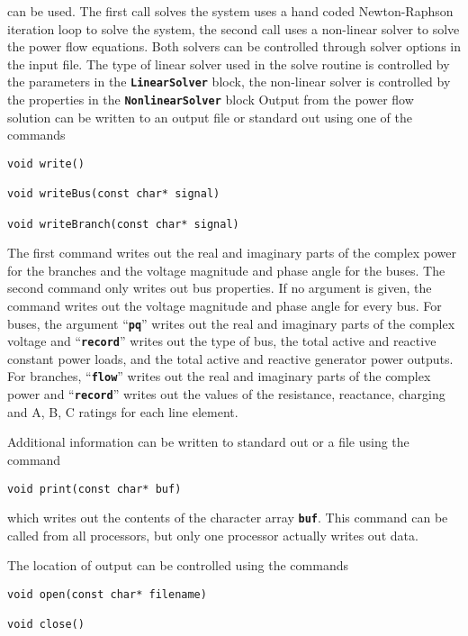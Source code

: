 can be used. The first call solves the system uses a hand coded Newton-Raphson iteration loop to solve the system, the second call uses a non-linear solver to solve the power flow equations. Both solvers can be controlled through solver options in the input file. The type of linear solver used in the solve routine is controlled by the parameters in the \texttt{\textbf{LinearSolver}} block, the non-linear solver is controlled by the properties in the \texttt{\textbf{NonlinearSolver}} block
Output from the power flow solution can be written to an output file or standard out using one of the commands

{
\color{red}
\begin{Verbatim}[fontseries=b]
void write()

void writeBus(const char* signal)

void writeBranch(const char* signal)
\end{Verbatim}
}

The first command writes out the real and imaginary parts of the complex power for the branches and the voltage magnitude and phase angle for the buses. The second command only writes out bus properties. If no argument is given, the command writes out the voltage magnitude and phase angle for every bus. For buses, the argument ``\texttt{\textbf{pq}}'' writes out the real and imaginary parts of the complex voltage and ``\texttt{\textbf{record}}'' writes out the type of bus, the total active and reactive constant power loads, and the total active and reactive generator power outputs. For branches, ``\texttt{\textbf{flow}}'' writes out the real and imaginary parts of the complex power and ``\texttt{\textbf{record}}'' writes out the values of the resistance, reactance, charging and A, B, C ratings for each line element.

Additional information can be written to standard out or a file using the command

{
\color{red}
\begin{Verbatim}[fontseries=b]
void print(const char* buf)
\end{Verbatim}
}

which writes out the contents of the character array \texttt{\textbf{buf}}. This command can be called from all processors, but only one processor actually writes out data.

The location of output can be controlled using the commands

{
\color{red}
\begin{Verbatim}[fontseries=b]
void open(const char* filename)

void close()
\end{Verbatim}
}

